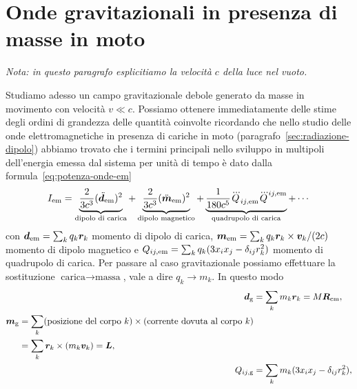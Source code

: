 \section{Onde gravitazionali in presenza di masse in moto}
\label{sec:onde-grav-masse}

\emph{Nota: in questo paragrafo esplicitiamo la velocità $c$ della luce nel
  vuoto.}

Studiamo adesso un campo gravitazionale debole generato da masse in movimento
con velocità $v \ll c$.  Possiamo ottenere immediatamente delle stime degli
ordini di grandezza delle quantità coinvolte ricordando che nello studio delle
onde elettromagnetiche in presenza di cariche in moto
(paragrafo~\ref{sec:radiazione-dipolo}) abbiamo trovato che i termini principali
nello sviluppo in multipoli dell'energia emessa dal sistema per unità di tempo è
dato dalla formula~\eqref{eq:potenza-onde-em}
\begin{equation}
  I_{\textup{em}} = \underbrace{\frac{2}{3c^{3}}
    (\ddot{\bm{d}}_{\textup{em}})^{2}}_{\text{dipolo di carica}} +
  \underbrace{\frac{2}{3c^{3}} (\ddot{\bm{m}}_{\textup{em}})^{2}}_{\text{dipolo
      magnetico}} +
  \underbrace{\frac{1}{180c^{5}}
    \dddot{Q}_{ij,\textup{em}}\dddot{Q}^{ij,\textup{em}}}_{\text{quadrupolo di
      carica}} + \cdots
\end{equation}
con $\bm{d}_{\textup{em}} = \sum_{k} q_{k} \bm{r}_{k}$ momento di dipolo di
carica,
$\bm{m}_{\textup{em}} = \sum_{k} q_{k} \bm{r}_{k} \times \bm{v}_{k}/(2c)$
momento di dipolo magnetico e
$Q_{ij,\textup{em}} = \sum_{k} q_{k}(3x_{i}x_{j} -\delta_{ij}r_{k}^{2})$ momento
di quadrupolo di carica.  Per passare al caso gravitazionale possiamo effettuare
la sostituzione $\text{carica} \to \text{massa}$, vale a dire $q_{k} \to m_{k}$.
In questo modo
\begin{subequations}
  \begin{align}
    \bm{d}_{\textup{g}} &= \sum_{k} m_{k} \bm{r}_{k} = M \bm{R}_{\textup{cm}},\\
    \begin{split}
      \bm{m}_{\textup{g}} &= \sum_{k} (\text{posizione del corpo $k$}) \times
      (\text{corrente dovuta al corpo $k$}) \\
      &= \sum_{k} \bm{r}_{k} \times (m_{k} \bm{v}_{k}) = \bm{L},
    \end{split} \\
    Q_{ij,\textup{g}} &= \sum_{k} m_{k}(3x_{i}x_{j} -
    \delta_{ij}r_{k}^{2}),
  \end{align}
\end{subequations}
